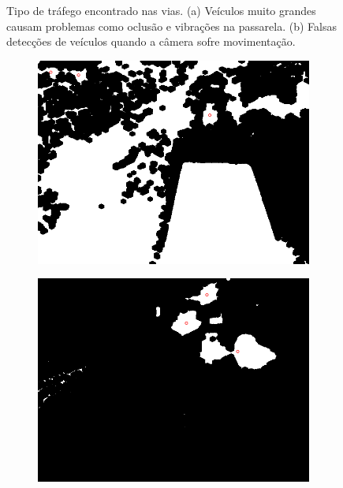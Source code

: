 \begin{figure}[ht]
\begin{center}
\begin{subfigure}[b]{.49\textwidth}
\begin{center}
      \end{center}
      \caption{}
      \label{fig:camera_moveu}
    \end{subfigure}
  \end{center}
  \caption{Tipo de tráfego encontrado nas vias. (a) Veículos muito grandes causam problemas como oclusão e vibrações na passarela. (b) Falsas detecções de veículos quando a câmera sofre movimentação.}
  \label{fig:tipo_de_trafego}
\end{figure}

\begin{figure}[ht]
  \begin{center}
    \begin{subfigure}[b]{.49\textwidth}
      \begin{center}
        \includegraphics[width=1\linewidth]{imgs/problema_veiculo_grande.png}
      \end{center}
      \caption{}
      \label{fig:problema_veiculo_grande}
    \end{subfigure}
    \begin{subfigure}[b]{.49\textwidth}
      \begin{center}
        \includegraphics[width=1\linewidth]{imgs/problema_veiculo_junto.png}

\end{center}
\end{subfigure}
\end{center}
\end{figure}
